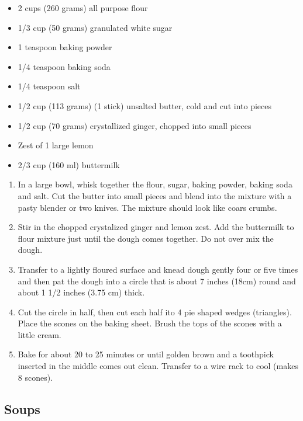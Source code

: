 \documentclass{article}
\begin{document}
\begin{framed}
\begin{itemize}
    \item 2 cups (260 grams) all purpose flour
    \item 1/3 cup (50 grams) granulated white sugar
    \item 1 teaspoon baking powder
    \item 1/4 teaspoon baking soda
    \item 1/4 teaspoon salt
    \item 1/2 cup (113 grams) (1 stick) unsalted butter, cold and cut into pieces
    \item 1/2 cup (70 grams) crystallized ginger, chopped into small pieces
    \item Zest of 1 large lemon
    \item 2/3 cup (160 ml) buttermilk
\end{itemize}
\end{framed}

\begin{enumerate}
    \item 
        In a large bowl, whisk together the flour, sugar, baking powder, baking soda and salt. Cut the butter into small pieces and blend into the mixture with a pasty blender or two knives. The mixture should look like coars crumbs.
    \item 
        Stir in the chopped crystalized ginger and lemon zest. Add the buttermilk to flour mixture just until the dough comes together. Do not over mix the dough.
    \item
        Transfer to a lightly floured surface and knead dough gently four or five times and then pat the dough into a circle that is about 7 inches (18cm) round and about 1 1/2 inches (3.75 cm) thick. 
    \item
        Cut the circle in half, then cut each half ito 4 pie shaped wedges (triangles). Place the scones on the baking sheet. Brush the tops of the scones with a little cream.
    \item
        Bake for about 20 to 25 minutes or until golden brown and a toothpick inserted in the middle comes out clean. Transfer to a wire rack to cool (makes 8 scones).
\end{enumerate}
\newpage

\vspace*{\fill}
\begin{center}
    \section{Soups}
\end{center}
\vspace*{\fill}
\newpage
\end{document}

